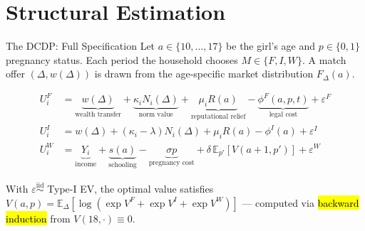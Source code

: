
\section{Structural Estimation}

\begin{frame}{The DCDP: Full Specification}
    Let $a \in \{10,\dots,17\}$ be the girl's age and $p \in \{0,1\}$ pregnancy status.
    Each period the household chooses $M \in \{F, I, W\}$. A match offer $(\Delta, w(\Delta))$
    is drawn from the age-specific market distribution $F_\Delta(a)$.

    \vspace{0.1cm}
    \begin{align*}
        U^F_i &= \underbrace{w(\Delta)}_{\text{wealth transfer}}
                 + \underbrace{\kappa_i N_i(\Delta)}_{\text{norm value}}
                 + \underbrace{\mu_i R(a)}_{\text{reputational relief}}
                 - \underbrace{\phi^F(a,p,t)}_{\text{legal cost}}
                 + \varepsilon^F \\[4pt]
        U^I_i &= w(\Delta) + (\kappa_i{-}\lambda)N_i(\Delta)
                 + \mu_i R(a) - \phi^I(a) + \varepsilon^I \\[4pt]
        U^W_i &= \underbrace{Y_i}_{\text{income}}
                 + \underbrace{s(a)}_{\text{schooling}}
                 - \underbrace{\sigma p}_{\text{pregnancy cost}}
                 + \delta\,\mathbb{E}_{p'}[V(a{+}1,p')]
                 + \varepsilon^W
    \end{align*}

    \vspace{0.1cm}
    \small
    With $\varepsilon \overset{\text{iid}}{\sim}$ Type-I EV, the optimal value satisfies
    $V(a,p) = \mathbb{E}_\Delta[\log(\exp V^F + \exp V^I + \exp V^W)]$ ---
    computed via \hl{backward induction} from $V(18,\cdot)\equiv 0$.
\end{frame}

